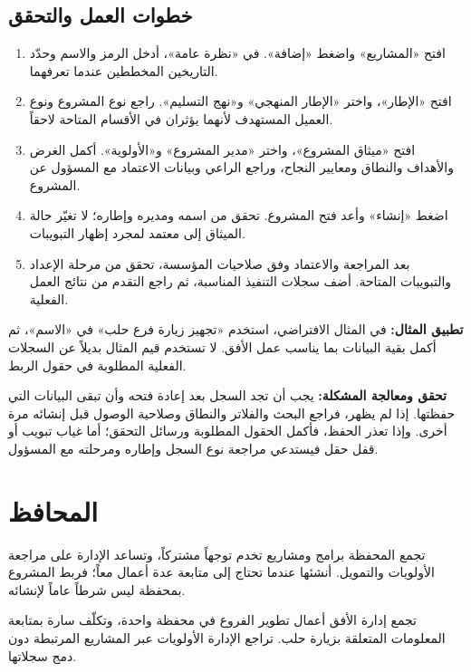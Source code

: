 \subsection{خطوات العمل والتحقق}
\begin{enumerate}
\item افتح «المشاريع» واضغط «إضافة». في «نظرة عامة»، أدخل الرمز والاسم وحدّد التاريخين المخططين عندما تعرفهما.
\item افتح «الإطار»، واختر «الإطار المنهجي» و«نهج التسليم». راجع نوع المشروع ونوع العميل المستهدف لأنهما يؤثران في الأقسام المتاحة لاحقاً.
\item افتح «ميثاق المشروع»، واختر «مدير المشروع» و«الأولوية». أكمل الغرض والأهداف والنطاق ومعايير النجاح، وراجع الراعي وبيانات الاعتماد مع المسؤول عن المشروع.
\item اضغط «إنشاء» وأعد فتح المشروع. تحقق من اسمه ومديره وإطاره؛ لا تغيّر حالة الميثاق إلى معتمد لمجرد إظهار التبويبات.
\item بعد المراجعة والاعتماد وفق صلاحيات المؤسسة، تحقق من مرحلة الإعداد والتبويبات المتاحة. أضف سجلات التنفيذ المناسبة، ثم راجع التقدم من نتائج العمل الفعلية.
\end{enumerate}

\textbf{تطبيق المثال:} في المثال الافتراضي، استخدم «تجهيز زيارة فرع حلب» في «الاسم»، ثم أكمل بقية البيانات بما يناسب عمل الأفق. لا تستخدم قيم المثال بديلاً عن السجلات الفعلية المطلوبة في حقول الربط.

\textbf{تحقق ومعالجة المشكلة:} يجب أن تجد السجل بعد إعادة فتحه وأن تبقى البيانات التي حفظتها. إذا لم يظهر، فراجع البحث والفلاتر والنطاق وصلاحية الوصول قبل إنشائه مرة أخرى. وإذا تعذر الحفظ، فأكمل الحقول المطلوبة ورسائل التحقق؛ أما غياب تبويب أو قفل حقل فيستدعي مراجعة نوع السجل وإطاره ومرحلته مع المسؤول.

\clearpage
\section{المحافظ}
\label{sec:projects-feature-portfolios}

تجمع المحفظة برامج ومشاريع تخدم توجهاً مشتركاً، وتساعد الإدارة على مراجعة الأولويات والتمويل. أنشئها عندما تحتاج إلى متابعة عدة أعمال معاً؛ فربط المشروع بمحفظة ليس شرطاً عاماً لإنشائه.

\begin{rcnote}
تجمع إدارة الأفق أعمال تطوير الفروع في محفظة واحدة، وتكلّف سارة بمتابعة المعلومات المتعلقة بزيارة حلب. تراجع الإدارة الأولويات عبر المشاريع المرتبطة دون دمج سجلاتها.
\end{rcnote}


